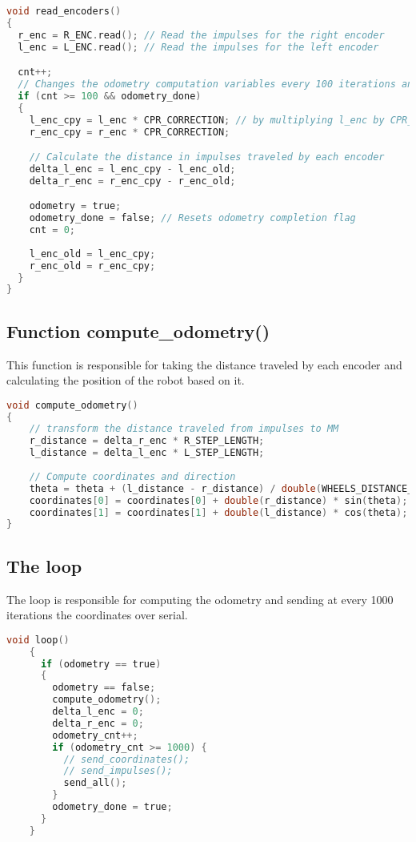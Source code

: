 \begin{lstlisting}[language=C]
void read_encoders()
{
  r_enc = R_ENC.read(); // Read the impulses for the right encoder
  l_enc = L_ENC.read(); // Read the impulses for the left encoder

  cnt++;
  // Changes the odometry computation variables every 100 iterations and only if the last odometry computation has finished
  if (cnt >= 100 && odometry_done)
  {
    l_enc_cpy = l_enc * CPR_CORRECTION; // by multiplying l_enc by CPR_CORRECTION it is taken in consideration the gear ratio error
    r_enc_cpy = r_enc * CPR_CORRECTION;

    // Calculate the distance in impulses traveled by each encoder
    delta_l_enc = l_enc_cpy - l_enc_old;
    delta_r_enc = r_enc_cpy - r_enc_old;

    odometry = true;
    odometry_done = false; // Resets odometry completion flag
    cnt = 0;
    
    l_enc_old = l_enc_cpy; 
    r_enc_old = r_enc_cpy;
  }
}
\end{lstlisting}

\subsection{Function compute\_odometry()}
This function is responsible for taking the distance traveled by each encoder and calculating the position of the robot based on it.

\begin{lstlisting}[language=C]
void compute_odometry()
{
    // transform the distance traveled from impulses to MM
    r_distance = delta_r_enc * R_STEP_LENGTH;
    l_distance = delta_l_enc * L_STEP_LENGTH;
      
    // Compute coordinates and direction
    theta = theta + (l_distance - r_distance) / double(WHEELS_DISTANCE_MM);
    coordinates[0] = coordinates[0] + double(r_distance) * sin(theta);
    coordinates[1] = coordinates[1] + double(l_distance) * cos(theta);
}
\end{lstlisting}

\subsection{The loop}
The loop is responsible for computing the odometry and sending at every 1000 iterations the coordinates over serial.

\begin{lstlisting}[language=C]
    void loop()
    {
      if (odometry == true)
      {
        odometry == false;
        compute_odometry();
        delta_l_enc = 0;
        delta_r_enc = 0;
        odometry_cnt++;
        if (odometry_cnt >= 1000) {
          // send_coordinates();
          // send_impulses();
          send_all();
        }
        odometry_done = true;
      }
    }
\end{lstlisting}

